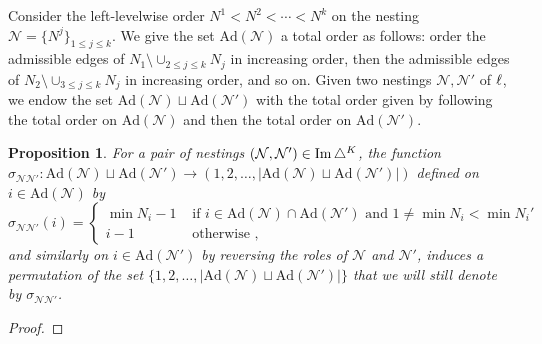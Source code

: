 \documentclass[twoside, 12pt]{amsart}
\newtheorem{proposition}[definition]{Proposition}
\theoremstyle{remark}
\begin{document}
Consider the left-levelwise order $N^1<N^2<\cdots < N^k$ on the nesting $\mathcal{N}=\{N^j\}_{1\leq j \leq k}$.
We give the set $\mathrm{Ad}(\mathcal{N})$ a total order as follows: order the admissible edges of $N_1 \setminus \cup_{2\leq j \leq k} N_j$ in increasing order, then the admissible edges of $N_2 \setminus \cup_{3\leq j \leq k} N_j$ in increasing order, and so on. 
Given two nestings $\mathcal{N}, \mathcal{N}'$ of $\ell$, we endow the set $\mathrm{Ad}(\mathcal{N})\sqcup \mathrm{Ad}(\mathcal{N}')$ with the total order given by following the total order on $\mathrm{Ad}(\mathcal{N})$ and then the total order on $\mathrm{Ad}(\mathcal{N}')$. 

\begin{proposition} 
\label{prop:signs-ass}
For a pair of nestings  $(\mathcal{N}, \mathcal{N}')\in \operatorname{Im}\triangle^K$, the function $\sigma_{\mathcal{N}\mathcal{N}'}: \mathrm{Ad}(\mathcal{N})\sqcup \mathrm{Ad}(\mathcal{N}') \to (1,2,\ldots,|\mathrm{Ad}(\mathcal{N})\sqcup \mathrm{Ad}(\mathcal{N}')|)$ defined on $i \in \mathrm{Ad}(\mathcal{N})$ by 
\begin{equation*}
  \sigma_{\mathcal{N}\mathcal{N}'}(i)= 
  \begin{cases}
    \min N_i -1 & \text{ if } i \in \mathrm{Ad}(\mathcal{N})\cap \mathrm{Ad}(\mathcal{N}') \text{ and } 1 \neq \min N_i < \min N_i' \\ 
    i-1 & \text{ otherwise ,} 
  \end{cases}
\end{equation*}
and similarly on $i \in \mathrm{Ad}(\mathcal{N}')$ by reversing the roles of $\mathcal{N}$ and $\mathcal{N}'$, induces a permutation of the set $\{1,2,\ldots,|\mathrm{Ad}(\mathcal{N})\sqcup \mathrm{Ad}(\mathcal{N}')|\}$ that we will still denote by $\sigma_{\mathcal{N}\mathcal{N}'}$.
\end{proposition}

\begin{proof}
\end{proof}
\end{document}
